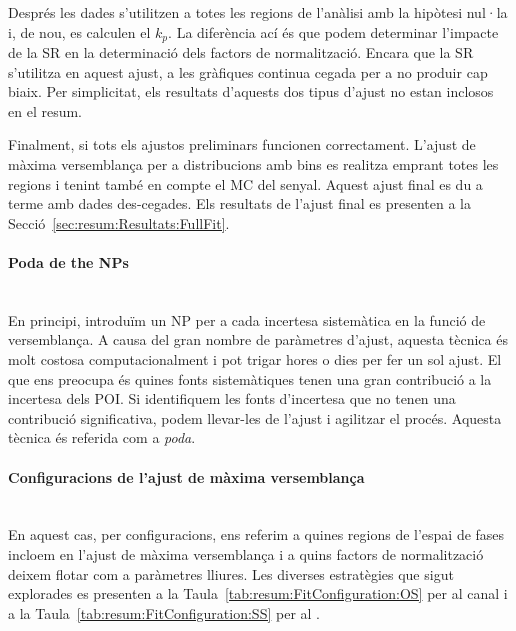 Després les dades s'utilitzen a totes les regions de l'anàlisi amb la hipòtesi nul·la i, de nou, es calculen el $k_{p}$. 
La diferència ací és que podem determinar l'impacte de la SR en la determinació dels factors de normalització. 
Encara que la SR s'utilitza en aquest ajust, a les gràfiques continua cegada per a no produir cap biaix.
Per simplicitat, els resultats d'aquests dos tipus d'ajust no estan inclosos en el resum. 

Finalment, si tots els ajustos preliminars funcionen correctament. L'ajust de màxima versemblança per a 
distribucions amb bins es realitza emprant totes les regions i tenint també en compte el MC del senyal. 
Aquest ajust final es du a terme amb dades des-cegades. Els resultats de l'ajust final es presenten a la 
Secció~\ref{sec:resum:Resultats:FullFit}.

\paragraph{Poda de the NPs}\mbox{}\\
En principi, introduïm un NP per a cada incertesa sistemàtica en la funció de versemblança.
A causa del gran nombre de paràmetres d'ajust, aquesta tècnica és molt costosa computacionalment
i pot trigar hores o dies per fer un sol ajust.
El que ens preocupa és quines fonts sistemàtiques tenen una gran contribució a la
incertesa dels POI.  Si identifiquem les fonts d'incertesa que no tenen una contribució significativa,
podem llevar-les de l'ajust i agilitzar el procés. Aquesta tècnica és referida com a \textit{poda}. 

\paragraph{Configuracions de l'ajust de màxima versemblança}\mbox{}\\
En aquest cas, per configuracions, ens referim a quines regions de l'espai de fases
incloem en l'ajust de màxima versemblança i a quins factors de normalització deixem
flotar com a paràmetres lliures. Les diverses estratègies que sigut explorades es presenten
a la Taula~\ref{tab:resum:FitConfiguration:OS} per al canal \dilepOStau i a la
Taula~\ref{tab:resum:FitConfiguration:SS} per al \dilepSStau.

